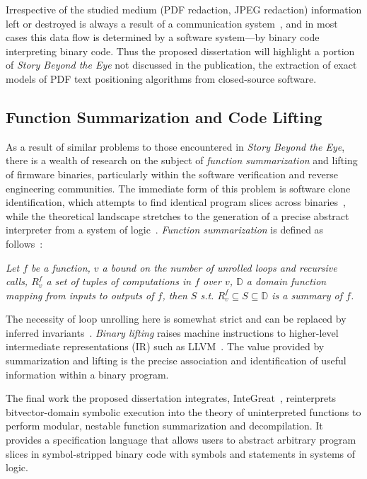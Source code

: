Irrespective of the studied medium (PDF redaction, JPEG redaction) information left or destroyed is always a result of a communication system~\cite{ash2012information}, and in most cases this data flow is determined by a software system---by binary code interpreting binary code.
Thus the proposed dissertation will highlight a portion of \emph{Story Beyond the Eye} not discussed in the publication, the extraction of exact models of PDF text positioning algorithms from closed-source software.

\subsection{Function Summarization and Code Lifting}
\label{sec:func-summarization}

As a result of similar problems to those encountered in \emph{Story Beyond the Eye}, there is a wealth of research on the subject of \emph{function summarization} and lifting of firmware binaries, particularly within the software verification and reverse engineering communities.
The immediate form of this problem is software clone identification, which attempts to find identical program slices across binaries~\cite{zhang2021survey}, while the theoretical landscape stretches to the generation of a precise abstract interpreter from a system of logic~\cite{thakurR12}.
\emph{Function summarization} is defined as follows~\cite{interpolation}:

\emph{Let $f$ be a function, $v$ a bound on the number of unrolled loops and recursive calls, $R_{v}^{f}$ a set of tuples of computations in $f$ over $v$, $\mathbb{D}$ a domain function mapping from inputs to outputs of $f$, then $S$ s.t. $R_{v}^{f} \subseteq S \subseteq \mathbb{D}$ is a summary of $f$.}

The necessity of loop unrolling here is somewhat strict and can be replaced by inferred invariants~\cite{furia2014loop}.
\emph{Binary lifting} raises machine instructions to higher-level intermediate representations (IR) such as LLVM~\cite{anand2013compiler,di2017rev,dinaburg2014mcsema}.
The value provided by summarization and lifting is the precise association and identification of useful information within a binary program.

The final work the proposed dissertation integrates, InteGreat~\cite{bland2023integreat}, reinterprets bitvector-domain symbolic execution into the theory of uninterpreted functions to perform modular, nestable function summarization and decompilation.
It provides a specification language that allows users to abstract arbitrary program slices in symbol-stripped binary code with symbols and statements in systems of logic.


